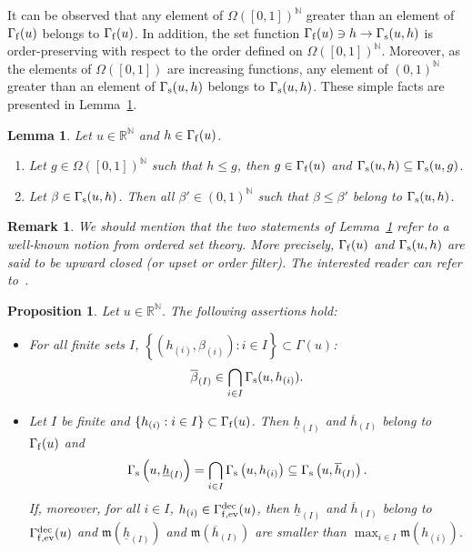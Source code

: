 \documentclass{article}
\def\funset{\Gamma}
\def\fmong{\funset_{{\rm ev}}^{\rm dec}}
\def\fmonfung{{\funset}_{\rm f,{\rm ev}}^{\rm dec}}
\def\fset{\Omega([0,1])}
\def\mon{\mathfrak{m}}
\def\secfunh{\funset_{\rm f}}
\def\secfunb{\funset_{\rm s}}
\def\rr{\mathbb R}
\def\nn{\mathbb N}
\newtheorem{prop}{Proposition}
\newtheorem{lemma}{Lemma}
\newtheorem{remark}{Remark}
\def\red#1{#1}
\def\blue#1{#1}
\begin{document}
	It can be observed that any element of $\fset^\nn$ greater than an element of $\secfunh(u)$ belongs to $\secfunh(u)$. \red{In addition}, the set function $\secfunh(u)\ni h\to \secfunb(u,h)$ is order-preserving with respect to the order defined on $\fset^\nn$. Moreover, as the \red{elements} of $\fset$ are increasing functions, any element of $(0,1)^\nn$ greater than an element of $\secfunb(u,h)$ belongs to $\secfunb(u,h)$. \red{These} simple facts are presented in Lemma~\ref{factlattice}.
	\begin{lemma}
		\label{factlattice}
		Let $u\in\rr^\nn$ and $h\in\secfunh(u)$. 
		\begin{enumerate}
			\item Let $\red{g}\in\fset^\nn$ such that $\red{h\leq g}$, then $\red{g}\in\secfunh(u)$ and $\red{\secfunb(u,h)\subseteq\secfunb(u,g)}$.
			\item Let $\beta\in\secfunb(u,h)$. Then all $\beta'\in (0,1)^\nn$ such that $\beta\leq\beta'$ belong to $\secfunb(u,h)$.
		\end{enumerate}
	\end{lemma}
	\begin{remark}
		We should mention that the two statements of Lemma~\ref{factlattice} refer to a well-known notion from ordered \red{set} theory. More precisely, $\secfunh(u)$ and $\secfunb(u,h)$ are said to be upward closed (or upset or order filter). The interested reader can \blue{refer to~\cite{MR1058437,MR2446182}}. 
	\end{remark}
	\begin{prop}
		\label{secfunprop}
		Let $u\in\rr^\nn$. The following assertions hold:
		\begin{itemize}
			\item For all finite sets $I$, $\left\{(h_{(i)},\beta_{(i)}): i\in I\right\}\subset \funset(u)$:
			\[
			\overline{\beta}_{(I)}\in \bigcap_{i\in I} \secfunb(u,h_{(i)}).
			\]
			
			\item Let $I$ be finite and $\{h_{(i)}: i\in I\}\subset \secfunh(u)$. Then $\underline{h}_{(I)}$ and $\overline{h}_{(I)}$ belong to $\secfunh(u)$ and
			\[
			\secfunb\left(u,\underline{h}_{(I)}\right)=\bigcap_{i\in I} \secfunb\left(u,h_{(i)}\right)\subseteq \secfunb\left(u,\overline{h}_{(I)}\right).
			\]
			If, moreover, for all $i\in I$, $h_{(i)}\in\fmonfung(u)$, then $\underline{h}_{(I)}$ and $\overline{h}_{(I)}$ belong to $\fmonfung(u)$ and $\mon(\underline{h}_{(I)})$ and $\mon(\overline{h}_{(I)})$ are smaller than $\displaystyle{\max_{i\in I} \mon(h_{(i)})}$.
		\end{itemize}
	\end{prop}
	
\end{document}
